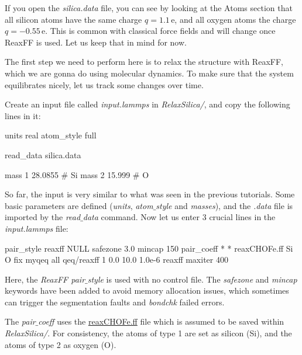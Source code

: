 \noindent If you open the \textit{silica.data} file, you can see 
by looking at the Atoms section that
all silicon atoms have the same charge $q = 1.1\,\text{e}$,
and all oxygen atoms the charge $q = -0.55\,\text{e}$.
This is common with classical force fields and will change once
ReaxFF is used. Let us keep that in mind for now.

\vspace{0.25cm} \noindent The first step we need to perform here is to relax
the structure with ReaxFF, which we are gonna do using molecular
dynamics. To make sure that the system equilibrates
nicely, let us track some changes over time.

\vspace{0.25cm} \noindent Create an input file called \textit{input.lammps} in \textit{RelaxSilica/},
and copy the following lines in it: 

\begin{lcverbatim}
units real
atom_style full

read_data silica.data

mass 1 28.0855 # Si
mass 2 15.999 # O
\end{lcverbatim}

\noindent So far, the input is very similar to what was seen
in the previous tutorials. Some basic parameters are
defined (\textit{units}, \textit{atom$\_$style} and \textit{masses}), and 
the \textit{.data} file is imported by the \textit{read$\_$data} command.
Now let us enter 3 crucial lines in the \textit{input.lammps} file:

\begin{lcverbatim}
pair_style reaxff NULL safezone 3.0 mincap 150
pair_coeff * * reaxCHOFe.ff Si O
fix myqeq all qeq/reaxff 1 0.0 10.0 1.0e-6 reaxff maxiter 400
\end{lcverbatim}

\noindent Here, the \textit{ReaxFF pair$\_$style} is used with no control file.
The \textit{safezone} and \textit{mincap} keywords have been added
to avoid memory allocation issues, which sometimes can trigger
the segmentation faults and \textit{bondchk} failed errors.

\vspace{0.25cm} \noindent The \textit{pair$\_$coeff} uses
the \href{https://lammpstutorials.github.io/lammpstutorials-inputs/level3/reactive-silicon-dioxide/RelaxSilica/reaxCHOFe.ff}{reaxCHOFe.ff} file which is assumed
to be saved within \textit{RelaxSilica/}.
For consistency, the atoms of type 1 are set as silicon (Si),
and the atoms of type 2 as oxygen (O).

